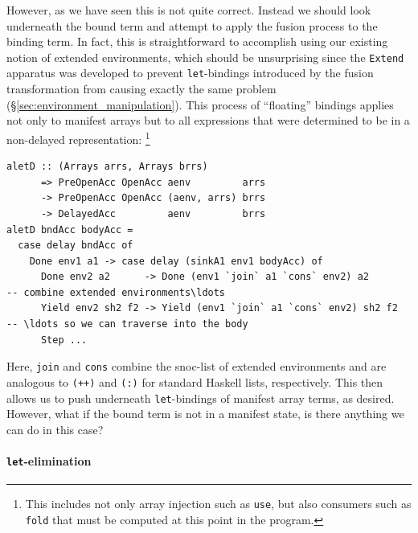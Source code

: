 However, as we have seen this is not quite correct. Instead we should look
underneath the bound term and attempt to apply the fusion process to the binding
term. In fact, this is straightforward to accomplish using our existing notion
of extended environments, which should be unsurprising since the \texttt{Extend}
apparatus was developed to prevent \texttt{let}-bindings introduced by the
fusion transformation from causing exactly the same problem
(\S\ref{sec:environment_manipulation}). This process of ``floating'' bindings
applies not only to manifest arrays but to all expressions that were determined
to be in a non-delayed representation:
\footnote{This includes not only array injection such as \texttt{use}, but also
consumers such as \texttt{fold} that must be computed at this point in the
program.}
%
\begin{lstlisting}[style=haskell]
aletD :: (Arrays arrs, Arrays brrs)
      => PreOpenAcc OpenAcc aenv         arrs
      -> PreOpenAcc OpenAcc (aenv, arrs) brrs
      -> DelayedAcc         aenv         brrs
aletD bndAcc bodyAcc =
  case delay bndAcc of
    Done env1 a1 -> case delay (sinkA1 env1 bodyAcc) of
      Done env2 a2      -> Done (env1 `join` a1 `cons` env2) a2        -- combine extended environments\ldots
      Yield env2 sh2 f2 -> Yield (env1 `join` a1 `cons` env2) sh2 f2   -- \ldots so we can traverse into the body
      Step ...
\end{lstlisting}
%
Here, \texttt{join} and \texttt{cons} combine the snoc-list of extended
environments and are analogous to \texttt{(++)} and \texttt{(:)} for standard
Haskell lists, respectively. This then allows us to push underneath
\texttt{let}-bindings of manifest array terms, as desired. However, what if the
bound term is not in a manifest state, is there anything we can do in this case?

\paragraph{\texttt{\bf let}-elimination}

